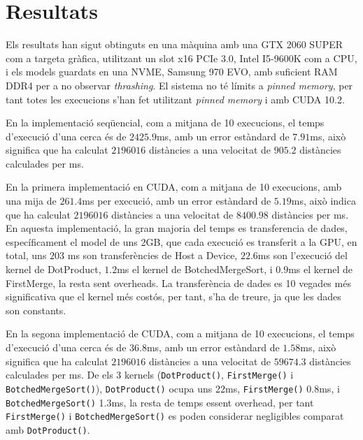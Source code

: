 \documentclass[catalan,10pt,a4paper]{article}
\begin{document}
\section*{Resultats}

Els resultats han sigut obtinguts en una màquina amb una GTX 2060 SUPER com a targeta gràfica, utilitzant un slot x16 PCIe 3.0, Intel I5-9600K com a CPU, i els models guardats en una NVME, Samsung 970 EVO, amb suficient RAM DDR4 per a no observar \textit{thrashing}. El sistema no té límits a \textit{pinned memory}, per tant totes les execucions s'han fet utilitzant \textit{pinned memory} i amb CUDA 10.2.


En la implementació seqüencial, com a mitjana de 10 execucions, el temps d'execució d'una cerca és de $2425.9$ms, amb un error estàndard de $7.91$ms, això significa que ha calculat $2196016$ distàncies a una velocitat de $905.2$ distàncies calculades per ms. 

En la primera implementació en CUDA, com a mitjana de 10 execucions, amb una mija de $261.4$ms per execució, amb un error estàndard de $5.19$ms, això indica que ha calculat $2196016$ distàncies a una velocitat de $8400.98$ distàncies per ms. En aquesta implementació, la gran majoria del temps es transferencia de dades, específicament el model de uns 2GB, que cada execució es transferit a la GPU, en total, uns $203$ ms son transferències de Host a Device, $22.6$ms son l'execució del kernel de DotProduct, $1.2$ms el kernel de BotchedMergeSort, i $0.9$ms el kernel de FirstMerge, la resta sent overheads. La transferència de dades es 10 vegades més significativa que el kernel més costós, per tant, s'ha de treure, ja que les dades son constants.


En la segona implementació de CUDA, com a mitjana de 10 execucions, el temps d'execució d'una cerca és de $36.8$ms, amb un error estàndard de $1.58$ms, això significa que ha calculat $2196016$ distàncies a una velocitat de $59674.3$ distàncies calculades per ms. De els 3 kernels (\verb|DotProduct()|, \verb|FirstMerge()| i \verb|BotchedMergeSort()|), \verb|DotProduct()| ocupa uns 22ms, \verb|FirstMerge()| 0.8ms, i \verb|BotchedMergeSort()| 1.3ms, la resta de temps essent overhead, per tant \verb|FirstMerge()| i \verb|BotchedMergeSort()| es poden considerar negligibles comparat amb \verb|DotProduct()|.
\end{document}
